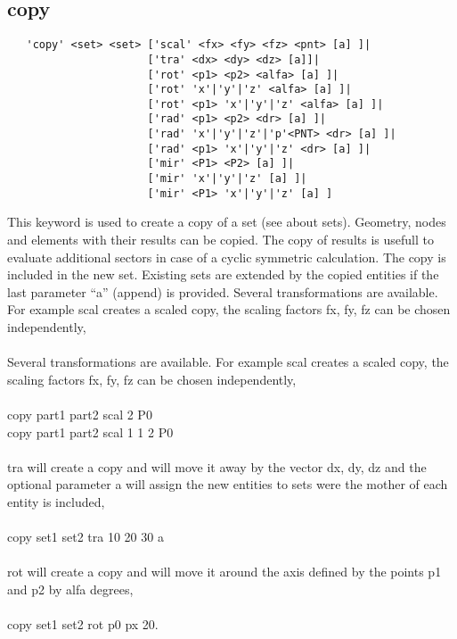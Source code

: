 \documentclass{article}
\begin{document}
\subsection{\label{copy}copy}
\begin{verbatim}
   'copy' <set> <set> ['scal' <fx> <fy> <fz> <pnt> [a] ]|
                      ['tra' <dx> <dy> <dz> [a]]|
                      ['rot' <p1> <p2> <alfa> [a] ]|
                      ['rot' 'x'|'y'|'z' <alfa> [a] ]|
                      ['rot' <p1> 'x'|'y'|'z' <alfa> [a] ]|
                      ['rad' <p1> <p2> <dr> [a] ]|
                      ['rad' 'x'|'y'|'z'|'p'<PNT> <dr> [a] ]|
                      ['rad' <p1> 'x'|'y'|'z' <dr> [a] ]|
                      ['mir' <P1> <P2> [a] ]| 
                      ['mir' 'x'|'y'|'z' [a] ]| 
                      ['mir' <P1> 'x'|'y'|'z' [a] ] 
\end{verbatim}
This keyword is used to create a copy of a set (see  about sets). Geometry, nodes and elements with their results can be copied. The copy of results is usefull to evaluate additional sectors in case of a cyclic symmetric calculation. The copy is included in the new set. Existing sets are extended by the copied entities if the last parameter ``a'' (append) is provided. Several transformations are available. For example scal creates a scaled copy, the scaling factors fx, fy, fz can be chosen independently,\\\\
Several transformations are available. For example scal creates a scaled copy, the scaling factors fx, fy, fz can be chosen independently,\\\\
copy part1 part2 scal 2 P0 \\
copy part1 part2 scal 1 1 2 P0\\\\
tra will create a copy and will move it away by the vector dx, dy, dz and the optional parameter a will assign the new entities to sets were the mother of each entity is included,\\\\
copy set1 set2 tra 10 20 30 a\\\\
rot will create a copy and will move it around the axis defined by the points p1 and p2 by alfa degrees,\\\\
copy set1 set2 rot p0 px 20.\\\\
\end{document}
